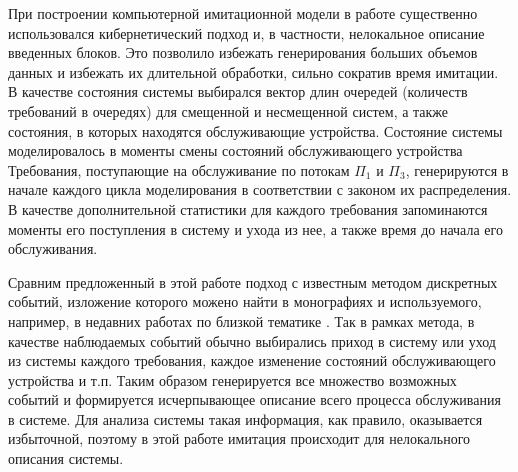\documentclass[11pt]{ubs}
\begin{document}
При построении компьютерной имитационной модели в работе существенно использовался кибернетический подход и, в частности, нелокальное описание введенных блоков. Это позволило избежать генерирования больших объемов данных и избежать их длительной обработки, сильно сократив время имитации. В качестве состояния системы  выбирался вектор длин очередей (количеств требований в очередях) для смещенной и несмещенной систем, а также состояния, в которых находятся обслуживающие устройства. Состояние системы моделировалось в моменты смены состояний обслуживающего устройства Требования, поступающие на обслуживание по потокам $\Pi_1$ и $\Pi_3$, генерируются в начале каждого цикла моделирования в соответствии с законом их распределения. В качестве дополнительной статистики для каждого требования запоминаются моменты его поступления в систему и ухода из нее, а также время до начала его обслуживания.

Сравним предложенный в этой работе подход с известным методом дискретных событий, изложение которого можено найти в монографиях \cite{Asmussen,averill} и используемого, например, в недавних работах по близкой тематике \cite{Fedotkin:Rachinskaya:2016,Fedotkin:A:2010}. Так в рамках метода, в качестве наблюдаемых событий обычно выбирались приход в систему или уход из системы каждого требования, каждое изменение состояний обслуживающего устройства и т.п. Таким образом генерируется все множество возможных событий и формируется исчерпывающее описание всего процесса обслуживания в системе. Для анализа системы такая информация, как правило, оказывается избыточной, поэтому в этой работе имитация происходит для нелокального описания системы.
\end{document}
